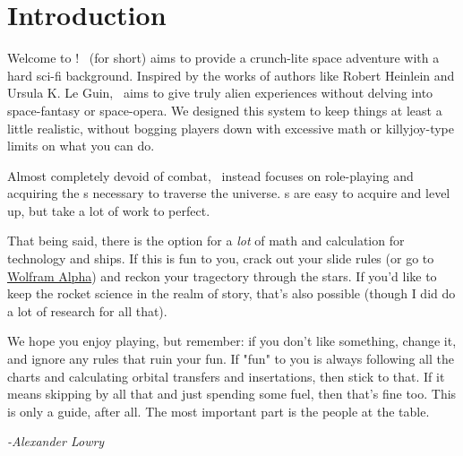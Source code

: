 \section{Introduction}

\par
Welcome to \getTitle! \getTitleShort\, (for short) aims to provide a crunch-lite space adventure with a hard sci-fi background. Inspired by the works of authors like Robert Heinlein and Ursula K. Le Guin, \getTitleShort\, aims to give truly alien experiences without delving into space-fantasy or space-opera. We designed this system to keep things at least a little realistic, without bogging players down with excessive math or killyjoy-type limits on what you can do.

\par
Almost completely devoid of combat, \getTitleShort\, instead focuses on role-playing and acquiring the \skill s necessary to traverse the universe. \skillC s are easy to acquire and level up, but take a lot of work to perfect.

\par
That being said, there is the option for a \textit{lot} of math and calculation for technology and ships. If this is fun to you, crack out your slide rules (or go to \hyperlink{http://www.wolframalpha.com}{Wolfram Alpha}) and reckon your tragectory through the stars. If you'd like to keep the rocket science in the realm of story, that's also possible (though I did do a lot of research for all that).

\par
We hope you enjoy playing, but remember: if you don't like something, change it, and ignore any rules that ruin your fun. If "fun" to you is always following all the charts and calculating orbital transfers and insertations, then stick to that. If it means skipping by all that and just spending some fuel, then that's fine too. This is only a guide, after all. The most important part is the people at the table.

\par
\textit{-Alexander Lowry}